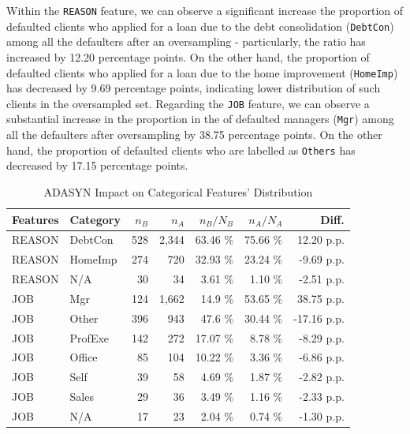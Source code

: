 Within the \texttt{REASON} feature, we can observe a significant increase the proportion of defaulted clients who applied for a loan due to the debt consolidation (\texttt{DebtCon}) among all the defaulters after an oversampling - particularly, the ratio has increased by 12.20 percentage points.
On the other hand, the proportion of defaulted clients who applied for a loan due to the home improvement (\texttt{HomeImp}) has decreased by 9.69 percentage points, indicating lower distribution of such clients in the oversampled set.
Regarding the \texttt{JOB} feature, we can observe a substantial increase in the proportion in the of defaulted managers (\texttt{Mgr}) among all the defaulters after oversampling by 38.75 percentage points.
On the other hand, the proportion of defaulted clients who are labelled as \texttt{Others} has decreased by 17.15 percentage points.

\begin{table}[H]
    \small
    \setlength{\tabcolsep}{8pt}
    \renewcommand{\arraystretch}{1.3}
    \centering
    \caption[ADASYN Impact on Categorical Features' Distribution]{ADASYN Impact on Categorical Features' Distribution}\label{tab:adasynimpact}
    \begin{tabular}{|ll|rr|rr|r|}
    
        \hline
    \textbf{Features} & \textbf{Category} & \textbf{$n_{B}$} & \textbf{$n_{A}$} & \textbf{$n_{B} / N_{B}$} & \textbf{$n_{A} / N_{A}$} & \textbf{Diff.} \\ 
    \midrule
    \midrule
    REASON & DebtCon & 528 & 2,344 & 63.46 \% & 75.66 \% & 12.20 p.p. \\ 
    REASON & HomeImp & 274 & 720 & 32.93 \% & 23.24 \% & -9.69 p.p. \\
    REASON & N/A & 30 & 34 & 3.61 \% & 1.10 \% & -2.51 p.p. \\
    \hline
    JOB & Mgr & 124 & 1,662 & 14.9 \% & 53.65 \% & 38.75 p.p. \\ 
    JOB & Other & 396 & 943 & 47.6 \% & 30.44 \% & -17.16 p.p. \\ 
    JOB & ProfExe & 142 & 272 & 17.07 \% & 8.78 \% & -8.29 p.p. \\ 
    JOB & Office & 85 & 104 & 10.22 \% & 3.36 \% & -6.86 p.p. \\ 
    JOB & Self & 39 & 58 & 4.69 \% & 1.87 \% & -2.82 p.p. \\
    JOB & Sales & 29 & 36 & 3.49 \% & 1.16 \% & -2.33 p.p. \\ 
    JOB & N/A & 17 & 23 & 2.04 \% & 0.74 \% & -1.30 p.p. \\ 
    \hline
    \bottomrule
    \end{tabular}
    \vspace{0.7em}
    
    \vspace{-1em}
\end{table}

